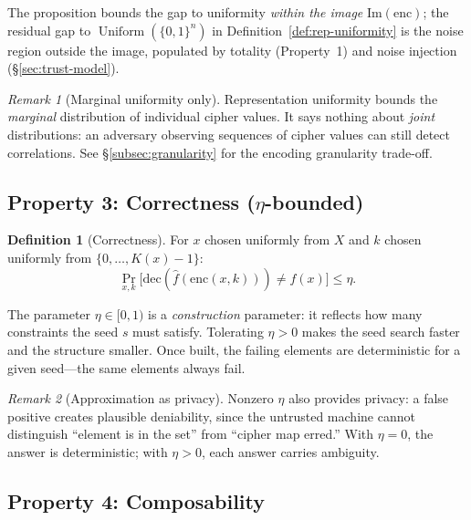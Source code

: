 \documentclass[11pt]{article}
\theoremstyle{definition}
\newtheorem{definition}{Definition}[section]
\theoremstyle{plain}
\theoremstyle{remark}
\newtheorem{remark}{Remark}[section]
\newcommand{\fhat}{\hat{f}}
\newcommand{\enc}{\mathrm{enc}}
\newcommand{\dec}{\mathrm{dec}}
\newcommand{\im}{\mathrm{Im}}
\DeclareMathOperator{\Uniform}{Uniform}
\begin{document}
The proposition bounds the gap to uniformity \emph{within the image}
$\im(\enc)$; the residual gap to $\Uniform(\{0,1\}^n)$ in
Definition~\ref{def:rep-uniformity} is the noise region outside the
image, populated by totality (Property~1) and noise injection
(\S\ref{sec:trust-model}).

\begin{remark}[Marginal uniformity only]
\label{rem:marginal-only}
Representation uniformity bounds the \emph{marginal} distribution of
individual cipher values.  It says nothing about \emph{joint} distributions:
an adversary observing sequences of cipher values can still detect
correlations.  See \S\ref{subsec:granularity} for the encoding granularity
trade-off.
\end{remark}

\subsection{Property 3: Correctness (\texorpdfstring{$\eta$}{eta}-bounded)}

\begin{definition}[Correctness]
\label{def:correctness}
For $x$ chosen uniformly from $X$ and $k$ chosen uniformly from
$\{0, \ldots, K(x)-1\}$:
\begin{equation}
\Pr_{x,k}\bigl[\dec(\fhat(\enc(x,k))) \neq f(x)\bigr] \leq \eta.
\end{equation}
\end{definition}

The parameter $\eta \in [0,1)$ is a \emph{construction} parameter: it
reflects how many constraints the seed $s$ must satisfy.  Tolerating
$\eta > 0$ makes the seed search faster and the structure smaller.  Once
built, the failing elements are deterministic for a given seed---the same
elements always fail.

\begin{remark}[Approximation as privacy]
Nonzero $\eta$ also provides privacy: a false positive creates plausible
deniability, since the untrusted machine cannot distinguish ``element is in
the set'' from ``cipher map erred.''  With $\eta = 0$, the answer is
deterministic; with $\eta > 0$, each answer carries ambiguity.
\end{remark}

\subsection{Property 4: Composability}
\end{document}
